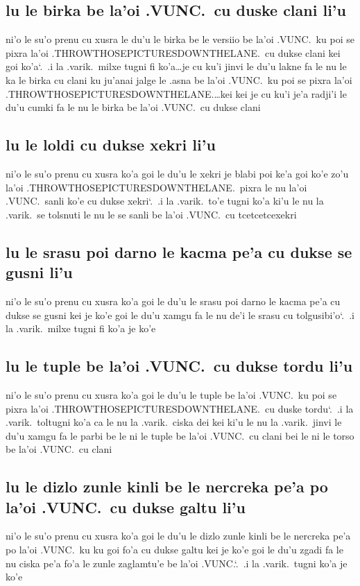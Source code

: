 \documentclass{report}
\newcommand\sds{\spacefactor\sfcode`.\ \space}
\begin{document}
\subsection{lu le birka be la'oi .VUNC.\ cu duske clani li'u}
ni'o le su'o prenu cu xusra le du'u le birka be le versiio be la'oi .VUNC.\ ku poi se pixra la'oi .THROWTHOSEPICTURESDOWNTHELANE.\ cu dukse clani kei goi ko'a\sds  .i la .varik.\ milxe tugni fi ko'a\ldots je cu ku'i jinvi le du'u lakne fa le nu le ka le birka cu clani ku ju'anai jalge le .asna be la'oi .VUNC.\ ku poi se pixra la'oi .THROWTHOSEPICTURESDOWNTHELANE.\ldots kei kei je cu ku'i je'a radji'i le du'u cumki fa le nu le birka be la'oi .VUNC.\ cu dukse clani

\subsection{lu le loldi cu dukse xekri li'u}
ni'o le su'o prenu cu xusra ko'a goi le du'u le xekri je blabi poi ke'a goi ko'e zo'u la'oi .THROWTHOSEPICTURESDOWNTHELANE.\ pixra le nu la'oi .VUNC.\ sanli ko'e cu dukse xekri\sds  .i la .varik.\ to'e tugni ko'a ki'u le nu la .varik.\ se tolsnuti le nu le se sanli be la'oi .VUNC.\ cu tcetcetcexekri

\subsection{lu le srasu poi darno le kacma pe'a cu dukse se gusni li'u}
ni'o le su'o prenu cu xusra ko'a goi le du'u le srasu poi darno le kacma pe'a cu dukse se gusni kei je ko'e goi le du'u xamgu fa le nu de'i le srasu cu tolgusibi'o\sds  .i la .varik.\ milxe tugni fi ko'a je ko'e

\subsection{lu le tuple be la'oi .VUNC.\ cu dukse tordu li'u}
ni'o le su'o prenu cu xusra ko'a goi le du'u le tuple be la'oi .VUNC.\ ku poi se pixra la'oi .THROWTHOSEPICTURESDOWNTHELANE.\ cu duske tordu\sds  .i la .varik.\ toltugni ko'a ca le nu la .varik.\ ciska dei kei ki'u le nu la .varik.\ jinvi le du'u xamgu fa le parbi be le ni le tuple be la'oi .VUNC.\ cu clani bei le ni le torso be la'oi .VUNC.\ cu clani

\subsection{lu le dizlo zunle kinli be le nercreka pe'a po la'oi .VUNC.\ cu dukse galtu li'u}
ni'o le su'o prenu cu xusra ko'a goi le du'u le dizlo zunle kinli be le nercreka pe'a po la'oi .VUNC.\ ku ku goi fo'a cu dukse galtu kei je ko'e goi le du'u zgadi fa le nu ciska pe'a fo'a le zunle zaglamtu'e be la'oi .VUNC.\sds  .i la .varik.\ tugni ko'a je ko'e
\end{document}
